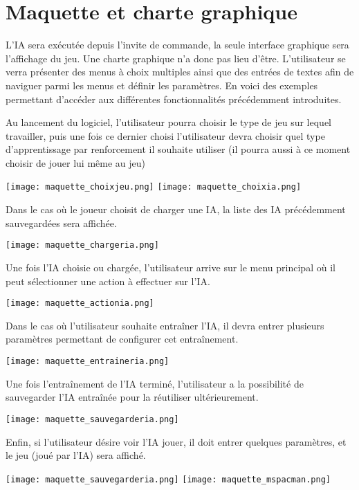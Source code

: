\chapter{Maquette et charte graphique}

L’IA sera exécutée depuis l’invite de commande, la seule interface graphique sera l’affichage du jeu.
Une charte graphique n'a donc pas lieu d'être.
L’utilisateur se verra présenter des menus à choix multiples ainsi que des entrées de textes afin de naviguer parmi les menus et définir les paramètres.
En voici des exemples permettant d’accéder aux différentes fonctionnalités précédemment introduites.

Au lancement du logiciel, l’utilisateur pourra choisir le type de jeu sur lequel travailler, puis une fois ce dernier choisi l’utilisateur devra choisir quel type d’apprentissage par renforcement il souhaite utiliser (il pourra aussi à ce moment choisir de jouer lui même au jeu)

\begin{center}
\texttt{[image: maquette\_choixjeu.png]}
\texttt{[image: maquette\_choixia.png]}
\end{center}

Dans le cas où le joueur choisit de charger une IA, la liste des IA précédemment sauvegardées sera affichée.

\begin{center}
\texttt{[image: maquette\_chargeria.png]}
\end{center}

Une fois l’IA choisie ou chargée, l’utilisateur arrive sur le menu principal où il peut sélectionner une action à effectuer sur l’IA.

\begin{center}
\texttt{[image: maquette\_actionia.png]}
\end{center}

Dans le cas où l’utilisateur souhaite entraîner l’IA, il devra entrer plusieurs paramètres permettant de configurer cet entraînement.

\begin{center}
\texttt{[image: maquette\_entraineria.png]}
\end{center}

Une fois l'entraînement de l’IA terminé, l'utilisateur a la possibilité de sauvegarder l’IA entraînée pour la réutiliser ultérieurement.

\begin{center}
\texttt{[image: maquette\_sauvegarderia.png]}
\end{center}

Enfin, si l’utilisateur désire voir l’IA jouer, il doit entrer quelques paramètres, et le jeu (joué par l’IA) sera affiché.

\begin{center}
\texttt{[image: maquette\_sauvegarderia.png]}
\texttt{[image: maquette\_mspacman.png]}
\end{center}
